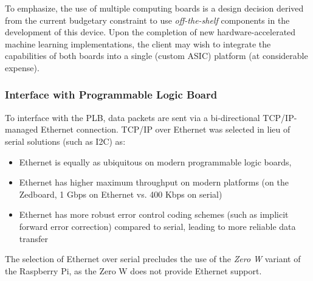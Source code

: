 To emphasize, the use of multiple computing boards is a design decision derived from the current budgetary constraint to use \textit{off-the-shelf} components in the development of this device. Upon the completion of new hardware-accelerated machine learning implementations, the client may wish to integrate the capabilities of both boards into a single (custom ASIC) platform (at considerable expense). 

\subsubsection{Interface with Programmable Logic Board}

To interface with the PLB, data packets are sent via a bi-directional TCP/IP-managed Ethernet connection. TCP/IP over Ethernet was selected in lieu of serial solutions (such as I2C) as:
\begin{itemize}
\item Ethernet is equally as ubiquitous on modern programmable logic boards,
\item Ethernet has higher maximum throughput on modern platforms (on the Zedboard, 1 Gbps on Ethernet vs. 400 Kbps on serial)
\item Ethernet has more robust error control coding schemes (such as implicit forward error correction\cite{mclaughlin_warland}) compared to serial, leading to more reliable data transfer
\end{itemize} 

The selection of Ethernet over serial precludes the use of the \textit{Zero W} variant of the Raspberry Pi, as the Zero W does not provide Ethernet support. 
